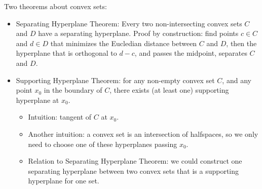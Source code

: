 \documentclass{report}
\begin{document}
Two theorems about convex sets: 
\begin{itemize}
\item Separating Hyperplane Theorem: Every two non-intersecting convex sets $C$ and $D$ have a separating hyperplane. Proof by construction: find points $c \in C$ and $d \in D$ that minimizes the Eucledian distance between $C$ and $D$, then the hyperplane that is orthogonal to $d - c$, and passes the midpoint, separates $C$ and $D$.

\item Supporting Hyperplane Theorem: for any non-empty convex set $C$, and any point $x_0$ in the boundary of $C$, there exists (at least one) supporting hyperplane at $x_0$. 
\begin{itemize}
\item Intuition: tangent of $C$ at $x_0$. 
\item Another intuition: a convex set is an intersection of halfspaces, so we only need to choose one of these hyperplanes passing $x_0$. 
\item Relation to Separating Hyperplane Theorem: we could construct one separating hyperplane between two convex sets that is a supporting hyperplane for one set. 
\end{itemize}
\end{itemize}
\end{document}
